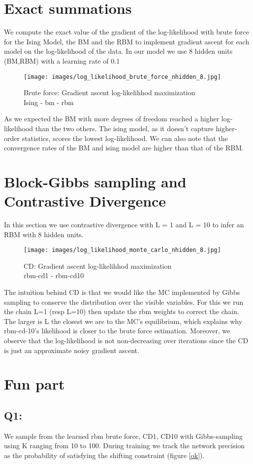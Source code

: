 \documentclass[11pt]{article}
\theoremstyle{exo}
\newcommand{\1}{\mathbbm{1}}
\begin{document}
\section{Exact summations}
We compute the exact value of the gradient of the log-likelihood with brute force for the Ising Model, the BM and the RBM to implement gradient ascent for each model on the log-likelihood of the data. In our model we use 8 hidden units (BM,RBM) with a learning rate of $0.1$
\begin{figure}[H]
\centering
\texttt{[image: images/log\_likelihood\_brute\_force\_nhidden\_8.jpg]}
\caption{Brute force: Gradient ascent log-likelihhod maximization\\Ising - bm - rbm}
\end{figure}
As we expected the BM with more degrees of freedom reached a higher log-likelihood than the two others. The ising model, as it doesn't capture higher-order statistics, scores the lowest log-likelihood. We can also note that the convergence rates of the BM and ising model are higher than that of the RBM.
\section{Block-Gibbs sampling and Contrastive Divergence}
In this section we use contrastive divergence with L = 1 and L = 10 to infer an RBM with 8 hidden units.
\begin{figure}[H]
\centering
\texttt{[image: images/log\_likelihood\_monte\_carlo\_nhidden\_8.jpg]}
\caption{CD: Gradient ascent log-likelihhod maximization\\rbm-cd1 - rbm-cd10}
\end{figure}
The intuition behind CD is that we would like the MC implemented by Gibbs sampling to conserve the distribution over the visible variables. For this we run the chain L=1 (resp L=10) then update the rbm weights to correct the chain. The larger is L the closest we are to the MC's equilibrium, which explains why rbm-cd-10's likelihood is closer to the brute force estimation.
Moreover, we observe that the log-likelihood is not non-decreasing over iterations since the CD is just an approximate noisy gradient ascent.
\section{Fun part}
\subsection{Q1:}
We sample from the learned rbm {brute force, CD1, CD10} with Gibbs-sampling using K ranging from 10 to 100. During training we track the network precision as the probability of satisfying the shifting constraint (figure \ref{ok}).
\end{document}
